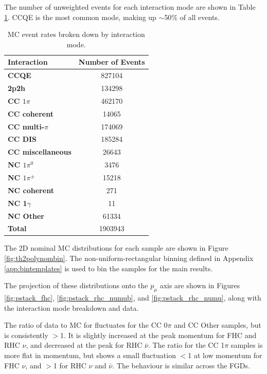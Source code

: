 The number of unweighted events for each interaction mode are shown in Table \ref{tab:modes}. CCQE is the most common mode, making up $\sim$50$\%$ of all events.

\begin{center}
\begin{table}[!htbp]
\center
\begin{tabular}{l||c}
\hline \hline
\textbf{Interaction} & \textbf{Number of Events}\\
\hline
\hline
\textbf{CCQE} & 827104 \\
\textbf{2p2h} & 134298 \\
\textbf{CC $1\pi$} & 462170 \\
\textbf{CC coherent} & 14065 \\
\textbf{CC multi-$\pi$} & 174069 \\
\textbf{CC DIS} & 185284 \\
\textbf{CC miscellaneous} & 26643 \\
\textbf{NC $1\pi^0$} & 3476 \\
\textbf{NC $1\pi^{\pm}$} & 15218 \\
\textbf{NC coherent} & 271 \\
\textbf{NC 1$\gamma$} & 11 \\
\textbf{NC Other} & 61334 \\ \hline
\textbf{Total} & 1903943\\ \hline\hline
\end{tabular}
\caption{MC event rates broken down by interaction mode.}
\label{tab:modes}
\end{table}
\end{center}
\vspace{-1cm}

The 2D nominal MC distributions for each sample are shown in Figure \ref{fig:th2polynombin}. The non-uniform-rectangular binning defined in Appendix \ref{app:bintemplates} is used to bin the samples for the main results. 

The projection of these distributions onto the $p_{\mu}$ axis are shown in Figures \ref{fig:pstack_fhc}, \ref{fig:pstack_rhc_numub}, and \ref{fig:pstack_rhc_numu}, along with the interaction mode breakdown and data.

The ratio of data to MC for fluctuates for the CC 0$\pi$ and CC Other samples, but is consistently $>$1. It is slightly increased at the peak momentum for FHC and RHC $\nu$, and decreased at the peak for RHC $\bar{\nu}$. The ratio for the CC 1$\pi$ samples is more flat in momentum, but shows a small fluctuation $<$1 at low momentum for FHC $\nu$, and $>$1 for RHC $\nu$ and $\bar{\nu}$. The behaviour is similar across the FGDs.

